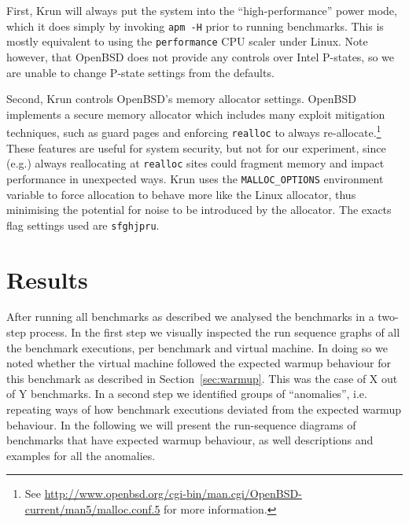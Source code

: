 \documentclass[10pt,preprint]{sigplanconf}
\newcommand{\krun}{Krun\xspace}
\begin{document}
First, \krun will always put the system into the ``high-performance'' power
mode, which it does simply by invoking \texttt{apm -H} prior to running
benchmarks. This is mostly equivalent to using the \texttt{performance} CPU
scaler under Linux. Note however, that OpenBSD does not provide any controls
over Intel P-states, so we are unable to change P-state settings from the
defaults.

Second, \krun controls OpenBSD's memory allocator settings. OpenBSD implements
a secure memory allocator which includes many exploit mitigation techniques,
such as guard pages and enforcing \texttt{realloc} to always
re-allocate.\footnote{See
\url{http://www.openbsd.org/cgi-bin/man.cgi/OpenBSD-current/man5/malloc.conf.5}
for more information.} These features are useful for system security, but not
for our experiment, since (e.g.) always reallocating at
\texttt{realloc} sites could fragment memory and impact performance in
unexpected ways. \krun uses the
\texttt{MALLOC\_OPTIONS} environment variable to force allocation to behave
more like the Linux allocator, thus minimising the potential for noise to be
introduced by the allocator. The exacts flag settings used are
\texttt{sfghjpru}.


\section{Results}
\label{sec:Results}


After running all benchmarks as described we analysed the benchmarks in a
two-step process. In the first step we visually inspected the run sequence
graphs of all the benchmark executions, per benchmark and virtual machine. In
doing so we noted whether the virtual machine followed the expected warmup
behaviour for this benchmark as described in Section~\ref{sec:warmup}. This was
the case of  X out of Y benchmarks. In a second step we
identified groups of ``anomalies'', i.e. repeating ways of how benchmark
executions deviated from the expected warmup behaviour. In the following we will
present the run-sequence diagrams of benchmarks that have expected warmup
behaviour, as well descriptions and examples for all the anomalies.

\end{document}
